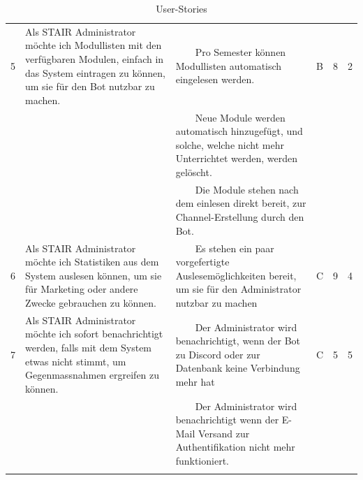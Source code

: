 \documentclass[a4paper, table]{article}
\newcommand{\tabitem}{~~\llap{\textbullet}~~}
\begin{document}
\begin{longtable}{ | p{1em} | p{16em} | p{13em} | p{2em} | p{3em} | p{2em} |}
    \hline
    5 & Als STAIR Administrator möchte ich Modullisten mit den verfügbaren Modulen, einfach in das System eintragen zu können,
    um sie für den Bot nutzbar zu machen. &
    \tabitem Pro Semester können Modullisten automatisch eingelesen werden. & B & 8 & 2 \\*
     & & \tabitem Neue Module werden automatisch hinzugefügt, und solche, welche nicht mehr Unterrichtet werden, werden gelöscht. & & & \\*
     & & \tabitem Die Module stehen nach dem einlesen direkt bereit, zur Channel-Erstellung durch den Bot. & & & \\
    \hline
    6 & Als STAIR Administrator möchte ich Statistiken aus dem System auslesen können,
    um sie für Marketing oder andere Zwecke gebrauchen zu können. &
    \tabitem Es stehen ein paar vorgefertigte Auslesemöglichkeiten bereit, um sie für den Administrator nutzbar zu machen & C & 9 & 4 \\
    \hline
    7 & Als STAIR Administrator möchte ich sofort benachrichtigt werden, falls mit dem System etwas nicht stimmt,
    um Gegenmassnahmen ergreifen zu können. &
    \tabitem Der Administrator wird benachrichtigt, wenn der Bot zu Discord oder zur Datenbank keine Verbindung mehr hat & C & 5 & 5 \\*
     & & \tabitem Der Administrator wird benachrichtigt wenn der E-Mail Versand zur Authentifikation nicht mehr funktioniert. & & & \\
    \hline
    \caption{User-Stories}
    \label{tab: UserStories}
\end{longtable}
\end{document}
